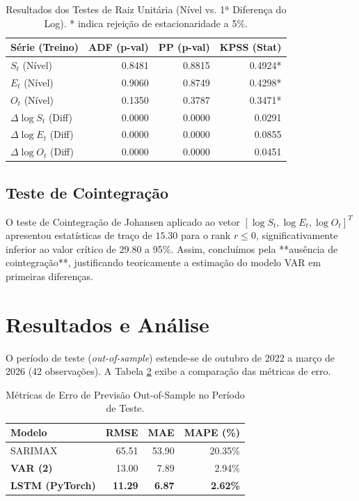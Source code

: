 \documentclass[11pt,a4paper]{article}
\begin{document}
\begin{table}[ht]
\centering
\small
\begin{tabular}{lrrr}
\toprule
\textbf{Série (Treino)} & \textbf{ADF (p-val)} & \textbf{PP (p-val)} & \textbf{KPSS (Stat)} \\
\midrule
$S_t$ (Nível) & 0.8481 & 0.8815 & 0.4924* \\
$E_t$ (Nível) & 0.9060 & 0.8749 & 0.4298* \\
$O_t$ (Nível) & 0.1350 & 0.3787 & 0.3471* \\
\midrule
$\Delta \log S_t$ (Diff) & 0.0000 & 0.0000 & 0.0291 \\
$\Delta \log E_t$ (Diff) & 0.0000 & 0.0000 & 0.0855 \\
$\Delta \log O_t$ (Diff) & 0.0000 & 0.0000 & 0.0451 \\
\bottomrule
\end{tabular}
\caption{Resultados dos Testes de Raiz Unitária (Nível vs. 1ª Diferença do Log). * indica rejeição de estacionaridade a 5\%.}
\label{tab:roots}
\end{table}

\subsection{Teste de Cointegração}
O teste de Cointegração de Johansen aplicado ao vetor $[\log S_t, \log E_t, \log O_t]^T$ apresentou estatísticas de traço de $15.30$ para o rank $r \leq 0$, significativamente inferior ao valor crítico de $29.80$ a 95\%. Assim, concluímos pela **ausência de cointegração**, justificando teoricamente a estimação do modelo VAR em primeiras diferenças.

\section{Resultados e Análise}
O período de teste (\textit{out-of-sample}) estende-se de outubro de 2022 a março de 2026 (42 observações). A Tabela \ref{tab:errors} exibe a comparação das métricas de erro.

\begin{table}[ht]
\centering
\small
\begin{tabular}{lrrr}
\toprule
\textbf{Modelo} & \textbf{RMSE} & \textbf{MAE} & \textbf{MAPE (\%)} \\
\midrule
SARIMAX & 65.51 & 53.90 & 20.35\% \\
\textbf{VAR (2)} & 13.00 & 7.89 & 2.94\% \\
\textbf{LSTM (PyTorch)} & \textbf{11.29} & \textbf{6.87} & \textbf{2.62\%} \\
\bottomrule
\end{tabular}
\caption{Métricas de Erro de Previsão Out-of-Sample no Período de Teste.}
\label{tab:errors}
\end{table}
\end{document}
